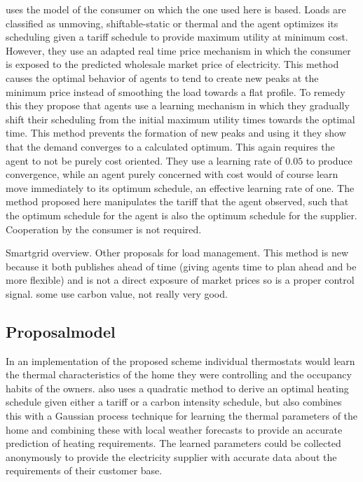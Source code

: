 \documentclass[a4paper, 10 pt, conference]{ieeeconf}  %
\begin{document}
\cite{ramchurn2011agent} uses the model of the consumer on which the one used here is based. Loads are classified as unmoving, shiftable-static or thermal and the agent optimizes its scheduling given a tariff schedule to provide maximum utility at minimum cost. However, they use an adapted real time price mechanism in which the consumer is exposed to the predicted wholesale market price of electricity. This method causes the optimal behavior of agents to tend to create new peaks at the minimum price instead of smoothing the load towards a flat profile. To remedy this they propose that agents use a learning mechanism in which they gradually shift their scheduling from the initial maximum utility times towards the optimal time. This method prevents the formation of new peaks and using it they show that the demand converges to a calculated optimum. This again requires the agent to not be purely cost oriented. They use a learning rate of $0.05$ to produce convergence, while an agent purely concerned with cost would of course learn move immediately to its optimum schedule, an effective learning rate of one. The method proposed here manipulates the tariff that the agent observed, such that the optimum schedule for the agent is also the optimum schedule for the supplier. Cooperation by the consumer is not required.

Smartgrid overview. Other proposals for load management. This method is new because it both publishes ahead of time (giving agents time to plan ahead and be more flexible) and is not a direct exposure of market prices so is a proper control signal. some use carbon value, not really very good.

\subsection{Proposalmodel}
In an implementation of the proposed scheme individual thermostats would learn the thermal characteristics of the home they were controlling and the occupancy habits of the owners. \cite{rogers2011adaptive} also uses a quadratic method to derive an optimal heating schedule given either a tariff or a carbon intensity schedule, but also combines this with a Gaussian process technique for learning the thermal parameters of the home and combining these with local weather forecasts to provide an accurate prediction of heating requirements. The learned parameters could be collected anonymously to provide the electricity supplier with accurate data about the requirements of their customer base. 
\end{document}
